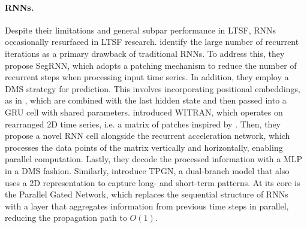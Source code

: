 \documentclass[a4paper,oneside,bibliography=totoc]{scrbook}
\begin{document}
\paragraph{RNNs.}
Despite their limitations and general subpar performance in LTSF, RNNs occasionally resurfaced in LTSF research. %
\citet{lin_segrnn_2023} identify the large number of recurrent iterations as a primary drawback of traditional RNNs. 
To address this, they propose SegRNN, which adopts a patching mechanism to reduce the number of recurrent steps when processing input time series. 
In addition, they employ a DMS strategy for prediction. This involves incorporating positional embeddings, as in \citet{vaswani_attention_2017}, which are combined with the last hidden state and then passed into a GRU cell with shared parameters.
\citet{jia_witran_2023} introduced WITRAN, which operates on rearranged 2D time series, i.e. a matrix of patches inspired by \citet{wu_timesnet_2022}.
Then, they propose a novel RNN cell alongside the recurrent acceleration network, which processes the data points of the matrix vertically and horizontally, enabling parallel computation. 
Lastly, they decode the processed information with a MLP in a DMS fashion. 
Similarly, \citet{jia_pgn_2024} introduce TPGN, a dual-branch model that also uses a 2D representation to capture long- and short-term patterns. 
At its core is the Parallel Gated Network, which replaces the sequential structure of RNNs with a layer that aggregates information from previous time steps in parallel, reducing the propagation path to  $O(1)$. 
\end{document}
